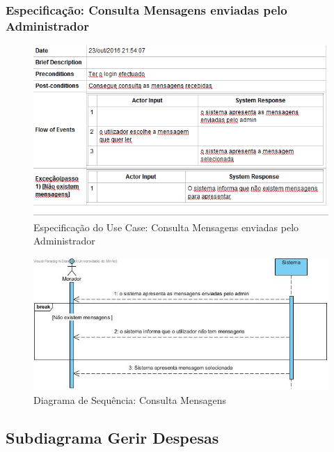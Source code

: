 \newpage

\subsubsection{Especificação: Consulta Mensagens enviadas pelo Administrador }
\begin{figure}[htb!]
	\centering
	\includegraphics[scale=0.6]{imagens/Especificacoes/consultasmsadmin}  
	\caption{Especificação do Use Case: Consulta Mensagens enviadas pelo Administrador}  
\end{figure}

\begin{figure}[htb!]
	\centering
	\includegraphics[scale=0.5]{imagens/diagramaSeq/ConsultarMensagensdoAdmin}  
	\caption{Diagrama de Sequência: Consulta Mensagens}  
\end{figure}

\subsection{Subdiagrama Gerir Despesas}

